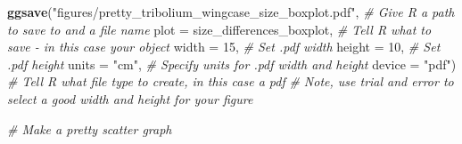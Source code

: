 \documentclass[
]{book}
\newenvironment{Shaded}{\begin{snugshade}}{\end{snugshade}}
\newcommand{\AttributeTok}[1]{\textcolor[rgb]{0.13,0.29,0.53}{#1}}
\newcommand{\CommentTok}[1]{\textcolor[rgb]{0.56,0.35,0.01}{\textit{#1}}}
\newcommand{\DecValTok}[1]{\textcolor[rgb]{0.00,0.00,0.81}{#1}}
\newcommand{\FunctionTok}[1]{\textcolor[rgb]{0.13,0.29,0.53}{\textbf{#1}}}
\newcommand{\NormalTok}[1]{#1}
\newcommand{\StringTok}[1]{\textcolor[rgb]{0.31,0.60,0.02}{#1}}
\begin{document}
\begin{Shaded}
\begin{Highlighting}[]
\FunctionTok{ggsave}\NormalTok{(}\StringTok{"figures/pretty\_tribolium\_wingcase\_size\_boxplot.pdf"}\NormalTok{, }\CommentTok{\# Give R a path to save to and a file name}
       \AttributeTok{plot =}\NormalTok{ size\_differences\_boxplot, }\CommentTok{\# Tell R what to save {-} in this case your object}
       \AttributeTok{width =} \DecValTok{15}\NormalTok{, }\CommentTok{\# Set .pdf width}
       \AttributeTok{height =} \DecValTok{10}\NormalTok{, }\CommentTok{\# Set .pdf height}
       \AttributeTok{units =} \StringTok{"cm"}\NormalTok{, }\CommentTok{\# Specify units for .pdf width and height}
       \AttributeTok{device =} \StringTok{"pdf"}\NormalTok{) }\CommentTok{\# Tell R what file type to create, in this case a pdf}
\CommentTok{\# Note, use trial and error to select a good width and height for your figure}

\CommentTok{\# Make a pretty scatter graph}


\end{Highlighting}
\end{Shaded}
\end{document}

